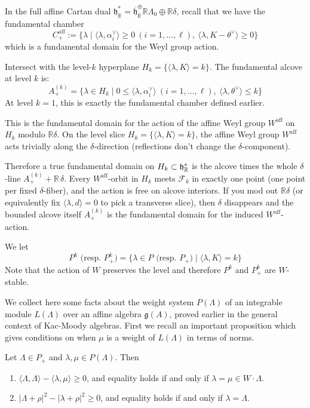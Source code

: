 \documentclass[12pt]{article}
\begin{document}
\begin{remark}
    In the full affine Cartan dual $\mathfrak{h}_\mathbb{R}^*=\overline{\mathfrak{h}}_\mathbb{R}^\oplus \mathbb{R}\Lambda_0\oplus \mathbb{R}\delta$, recall that we have the fundamental chamber
    \[C_+^{\text{aff}} := \{\lambda \mid \langle \lambda,\alpha_i^\vee\rangle\ge 0\ (i=1,\dots,\ell),\ \langle \lambda,K-\theta^\vee\rangle\ge 0\}\] which is a fundamental domain for the Weyl group action.

    Intersect with the level-$k$ hyperplane $H_k=\{\langle \lambda,K\rangle=k\}$. The fundamental alcove at level $k$ is:
    \[A_+^{(k)} = \{\lambda\in H_k \mid 0\le \langle \lambda,\alpha_i^\vee\rangle\ (i=1,\dots,\ell),\ \langle \lambda,\theta^\vee\rangle\le k\}\]
    At level $k=1$, this is exactly the fundamental chamber defined earlier.

    This is the fundamental domain for the action of the affine Weyl group $W^{\text{aff}}$ on $H_k$ modulo $\mathbb{R}\delta$. On the level slice $H_k=\{\langle\lambda,K\rangle=k\}$, the affine Weyl group $W^{\text{aff}}$ acts trivially along the $\delta$-direction (reflections don't change the $\delta$-component).

    Therefore a true fundamental domain on $H_k \subset \mathfrak{h}^*_{\mathbb{R}}$ is the alcove times the whole $\delta$-line $A_+^{(k)} + \mathbb{R}\,\delta$. Every $W^{\text{aff}}$-orbit in $H_k$ meets $\mathcal{F}_k$ in exactly one point (one point per fixed $\delta$-fiber), and the action is free on alcove interiors. If you mod out $\mathbb{R}\delta$ (or equivalently fix $\langle\lambda,d\rangle=0$ to pick a transverse slice), then $\delta$ disappears and the bounded alcove itself $A_+^{(k)}$ is the fundamental domain for the induced $W^{\text{aff}}$-action.
\end{remark}

We let
\[P^k \text{ (resp. } P^k_+) = \{ \lambda \in P \text{ (resp. } P_+) \mid \langle \lambda, K \rangle = k \}\] Note that the action of $W$ preserves the level and therefore $P^k$ and $P_+^k$ are $W$-stable.


We collect here some facts about the weight system $P(\Lambda)$ of an integrable module $L(\Lambda)$ over an affine algebra $\mathfrak{g}(A)$, proved earlier in the general context of Kac-Moody algebras. First we recall an important proposition which gives conditions on when $\mu$ is a weight of $L(\Lambda)$ in terms of norms.

\begin{proposition}
    Let $\Lambda \in P_+$ and $\lambda, \mu \in P(\Lambda)$. Then
    \begin{enumerate}
        \item $\langle \Lambda, \Lambda \rangle - \langle \lambda, \mu \rangle \ge 0$, and equality holds if and only if $\lambda = \mu \in W \cdot \Lambda$.
        \item $|\Lambda + \rho|^2 - |\lambda + \rho|^2 \ge 0$, and equality holds if and only if $\lambda = \Lambda$.
    \end{enumerate}
\end{proposition}
\end{document}
